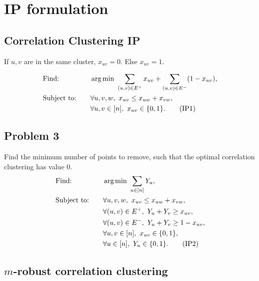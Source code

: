 \section{IP formulation}

\subsection{Correlation Clustering IP}

If $u,v$ are in the same cluster, $x_{uv} = 0$. Else $x_{uv} = 1$.

\begin{alignat}{3} \label{IP:CC}
		&\text{Find: } && \operatorname*{arg\,min}\ \sum_{(u,v) \in E^+} x_{uv} + \sum_{(u,v) \in E^-} (1- x_{uv}), \nonumber\\
		&\text{Subject to:} \quad && \forall u,v,w,\ x_{uv} \le x_{uw} + x_{vw}, \nonumber\\
		& && \forall u,v \in [n],\ x_{uv} \in \{ 0,1 \}.\tag{IP1}
\end{alignat}

\subsection{Problem 3}

Find the minimum number of points to remove, such that the optimal correlation clustering has value $0$.
\begin{alignat}{3} \label{IP:CC3}
		&\text{Find: } && \operatorname*{arg\,min}\ \sum_{u \in [n]} Y_u, \nonumber\\
		&\text{Subject to:} \quad && \forall u,v,w,\ x_{uv} \le x_{uw} + x_{vw}, \nonumber\\
		& && \forall (u,v) \in E^+,\ Y_u + Y_v \ge x_{uv}, \nonumber\\
		& && \forall (u,v) \in E^-,\ Y_u + Y_v \ge 1 - x_{uv}, \nonumber\\
		& && \forall u,v \in [n],\ x_{uv} \in \{ 0,1 \},\nonumber\\
		& && \forall u \in [n],\ Y_u \in \{ 0,1 \}. \tag{IP2}
\end{alignat}

\subsection{$m$-robust correlation clustering}

